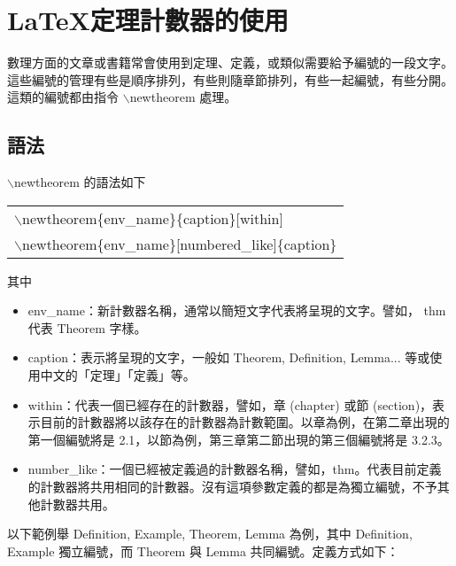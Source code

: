 %
%
%
%
%
%
\chapter{ \LaTeX {\MB 定理計數器的使用}}
數理方面的文章或書籍常會使用到定理、定義，或類似需要給予編號的一段文字。這些編號的管理有些是順序排列，有些則隨章節排列，有些一起編號，有些分開。這類的編號都由指令 {\A $\backslash$newtheorem} 處理。  

\section{{\MB 語法}}
$\backslash$newtheorem 的語法如下

 \begin{center}{\begin{tabular}{l}
 $\backslash$newtheorem\{env\_name\}\{caption\}[within]\\
 $\backslash$newtheorem\{env\_name\}[numbered\_like]\{caption\}\\
 \end{tabular}}\end{center}
其中
\begin{itemize}
\item env\_name：新計數器名稱，通常以簡短文字代表將呈現的文字。譬如， thm 代表 Theorem 字樣。
\item caption：表示將呈現的文字，一般如 Theorem, Definition, Lemma... 等或使用中文的「定理」「定義」等。
\item within：代表一個已經存在的計數器，譬如，章 (chapter) 或節 (section)，表示目前的計數器將以該存在的計數器為計數範圍。以章為例，在第二章出現的第一個編號將是 2.1，以節為例，第三章第二節出現的第三個編號將是 3.2.3。
\item number\_like：一個已經被定義過的計數器名稱，譬如，thm。代表目前定義的計數器將共用相同的計數器。沒有這項參數定義的都是為獨立編號，不予其他計數器共用。
\end{itemize}
以下範例舉 Definition, Example, Theorem, Lemma 為例，其中 Definition, Example 獨立編號，而 Theorem 與 Lemma 共同編號。定義方式如下：

